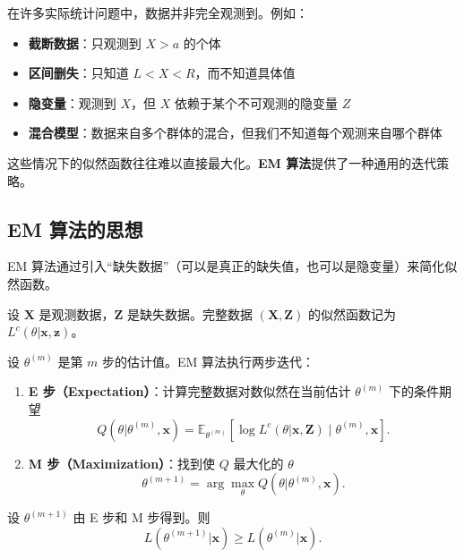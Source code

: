 在许多实际统计问题中，数据并非完全观测到。例如：

\begin{itemize}
\item \textbf{截断数据}：只观测到 $X > a$ 的个体
\item \textbf{区间删失}：只知道 $L < X < R$，而不知道具体值
\item \textbf{隐变量}：观测到 $X$，但 $X$ 依赖于某个不可观测的隐变量 $Z$
\item \textbf{混合模型}：数据来自多个群体的混合，但我们不知道每个观测来自哪个群体
\end{itemize}

这些情况下的似然函数往往难以直接最大化。\textbf{EM 算法}提供了一种通用的迭代策略。

\subsection{EM 算法的思想}

EM 算法通过引入``缺失数据''（可以是真正的缺失值，也可以是隐变量）来简化似然函数。

设 $\mathbf{X}$ 是观测数据，$\mathbf{Z}$ 是缺失数据。完整数据 $(\mathbf{X}, \mathbf{Z})$ 的似然函数记为 $L^c(\theta|\mathbf{x}, \mathbf{z})$。

设 $\theta^{(m)}$ 是第 $m$ 步的估计值。EM 算法执行两步迭代：

\begin{enumerate}
\item \textbf{E 步（Expectation）}：计算完整数据对数似然在当前估计 $\theta^{(m)}$ 下的条件期望
\[
Q(\theta|\theta^{(m)}, \mathbf{x}) = \mathbb{E}_{\theta^{(m)}}\left[ \log L^c(\theta|\mathbf{x}, \mathbf{Z}) \mid \theta^{(m)}, \mathbf{x} \right].
\label{eq:em-e-step}
\]

\item \textbf{M 步（Maximization）}：找到使 $Q$ 最大化的 $\theta$
\[
\theta^{(m+1)} = \arg\max_{\theta} Q(\theta|\theta^{(m)}, \mathbf{x}).
\label{eq:em-m-step}
\]
\end{enumerate}


\begin{theorem}[EM 算法的单调性]\label{th:em-monotonicity}
设 $\theta^{(m+1)}$ 由 E 步和 M 步得到。则
\[
L(\theta^{(m+1)}|\mathbf{x}) \geq L(\theta^{(m)}|\mathbf{x}).
\label{eq:em-monotonicity}
\]
\end{theorem}

